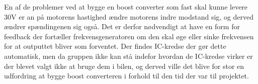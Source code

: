 En af de problemer ved at bygge en boost converter som fast skal kunne levere 30V er an på motorens hastighed ændre motorens indre modstand sig, og derved ændrer spændingenen sig også. Det er derfor nødvendigt at have en form for feedback der fortæller frekvensgeneratoren om den skal øge eller sinke frekvensen for at outputtet bliver som forventet. Der findes IC-kredse der gør dette automatisk, men da gruppen ikke kan stå indefor hvordan de IC-kredse virker er der blevet valgt ikke at bruge dem i  bilen, og derved ville det blive for stor en udfordring at bygge boost converteren i forhold til den tid der var til projektet.
